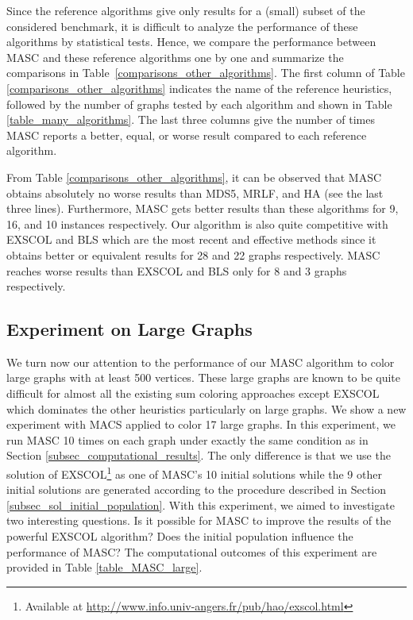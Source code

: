 \documentclass{elsart}
\begin{document}
Since the reference algorithms give only results for a (small) subset of the considered benchmark, it is difficult to analyze the performance of these algorithms by statistical tests. Hence, we compare the performance between MASC and these reference algorithms one by one and summarize the comparisons in Table~\ref{comparisons_other_algorithms}. The first column of Table \ref{comparisons_other_algorithms} indicates the name of the reference heuristics, followed by the number  of graphs tested by each algorithm and shown in Table \ref{table_many_algorithms}. The last three columns give the number of times MASC reports a better, equal, or worse result compared to each reference algorithm.

From Table \ref{comparisons_other_algorithms}, it can be observed  that MASC obtains absolutely no worse results than MDS5, MRLF, and HA (see the last three lines). Furthermore, MASC gets better results than these algorithms for 9, 16, and 10 instances respectively. Our algorithm is also quite competitive with EXSCOL and BLS which are the most recent and effective methods since it obtains better or equivalent results for 28 and 22 graphs respectively. MASC reaches worse results than EXSCOL and BLS only for 8 and 3 graphs respectively.


\subsection{Experiment on Large Graphs}
\label{subsec_experiments_large}

We turn now our attention to the performance of our MASC algorithm to color large graphs with at least 500 vertices. These large graphs are known to be quite difficult for almost all the existing sum coloring approaches except EXSCOL which dominates the other heuristics particularly on large graphs. We show a new experiment with MACS applied to color 17 large graphs. In this experiment, we run MASC 10 times on each graph under exactly the same condition as in Section \ref{subsec_computational_results}. The only difference is that we use the solution of EXSCOL\footnote{Available at \url{http://www.info.univ-angers.fr/pub/hao/exscol.html}} as one of MASC's 10 initial solutions while the 9 other initial solutions are generated according to the procedure described in Section \ref{subsec_sol_initial_population}. With this experiment, we aimed to investigate two interesting questions. Is it possible for MASC to improve the results of the powerful EXSCOL algorithm? Does the initial population influence the performance of MASC? The computational outcomes of this experiment are provided in Table \ref{table_MASC_large}.
\end{document}
